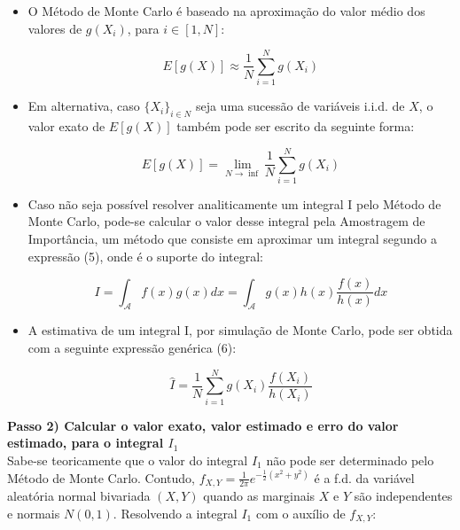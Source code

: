 \documentclass[letterpaper,11pt]{article}
\begin{document}
\begin{itemize}

\item O Método de Monte Carlo é baseado na aproximação do valor médio dos valores de $g(X_i)$, para $i \in [1,N]$:

\begin{equation} 
E[g(X)] \approx \frac{1}{N} \sum_{i=1}^{N}g(X_i)
\end{equation}

\item Em alternativa, caso $\{X_i\}_{i \in N}$ seja uma sucessão de variáveis i.i.d. de $X$, o valor exato de $E[g(X)]$ também pode ser escrito da seguinte forma:

\begin{equation} 
E[g(X)] =  \lim_{N \to \inf} \frac{1}{N}\sum_{i=1}^{N}g(X_i)
\end{equation}

\item Caso não seja possível resolver analiticamente um integral I pelo Método de Monte Carlo, pode-se calcular o valor desse integral pela Amostragem de Importância, um método que consiste em aproximar um integral segundo a expressão (5), onde  é o suporte do integral:

\begin{equation} 
I = \int_{\mathcal{A}} f(x)g(x)dx = \int_{\mathcal{A}} g(x)h(x)\frac{f(x)}{h(x)}dx
\end{equation}

\item A estimativa de um integral I, por simulação de Monte Carlo, pode ser obtida com a seguinte expressão genérica (6):

\begin{equation} 
\hat{I} = \frac{1}{N} \sum_{i=1}^{N}g(X_i)\frac{f(X_i)}{h(X_i)}
\end{equation}

\end{itemize}

\textbf{Passo 2) Calcular o valor exato, valor estimado e erro do valor estimado, para o integral $I_1$} \\

Sabe-se teoricamente que o valor do integral $I_1$ não pode ser determinado pelo Método de Monte Carlo. Contudo, $f_{X,Y}=\frac{1}{2\pi}e^{-\frac{1}{2}(x^2+y^2)}$ é a f.d. da variável aleatória normal bivariada $(X,Y)$ quando as marginais $X$ e $Y$ são independentes e normais $N(0,1)$. Resolvendo a integral $I_1$ com o auxílio de $f_{X,Y}$:
\end{document}
